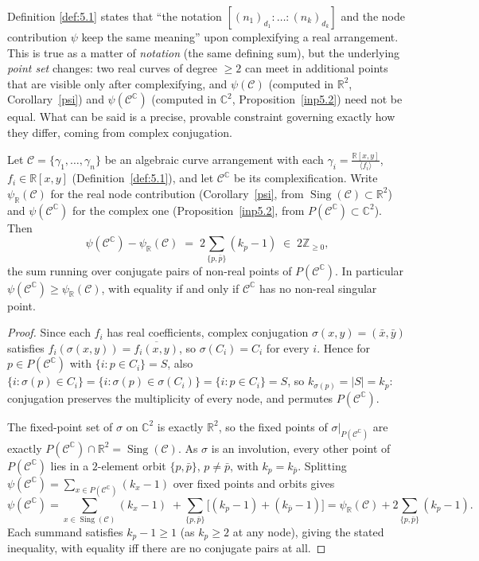 \documentclass[article,11pt]{amsart} \numberwithin{equation}{section}
\numberwithin{equation}{section}
\begin{document}
{Definition \ref{def:5.1} states that ``the notation $[(n_1)_{d_1}:\dots:(n_k)_{d_k}]$ and the
node contribution $\psi$ keep the same meaning'' upon complexifying a real arrangement. This is true as a matter of \emph{notation} (the same defining
sum), but the underlying \emph{point set} changes: two real curves of degree
$\ge2$ can meet in additional points that are visible only after
complexifying, and $\psi(\mathcal C)$ (computed in $\mathbb R^2$, Corollary~\ref{psi}) and
$\psi(\mathcal C^\mathbb C)$ (computed in $\mathbb C^2$, Proposition~\ref{inp5.2}) need not be
equal. What can be said is a precise, provable constraint governing exactly
how they differ, coming from complex conjugation.

\begin{inp}
	\label{prop:real-complex-psi}
	Let $\mathcal C=\{\gamma_1,\dots,\gamma_n\}$ be an algebraic curve
	arrangement with each $\gamma_i= \frac{\mathbb R [x,y]}{\langle f_i\rangle}$, $f_i\in\mathbb R[x,y]$ (Definition~\ref{def:5.1}),
	and let $\mathcal C^\mathbb C$ be its complexification. Write $\psi_\mathbb R(\mathcal C)$
	for the real node contribution (Corollary~\ref{psi}, from
	$\operatorname{Sing}(\mathcal C)\subset\mathbb R^2$) and $\psi(\mathcal C^\mathbb C)$ for the complex one
	(Proposition~\ref{inp5.2}, from $P(\mathcal C^\mathbb C)\subset\mathbb C^2$). Then
	\[
	\psi(\mathcal C^\mathbb C)-\psi_\mathbb R(\mathcal C)
	\;=\;2\!\!\sum_{\{p,\bar p\}}\!(k_p-1)\;\in\;2\mathbb Z_{\ge0},
	\]
	the sum running over conjugate pairs of non-real points of $P(\mathcal
	C^\mathbb C)$. In particular $\psi(\mathcal C^\mathbb C)\ge\psi_\mathbb R(\mathcal C)$, with
	equality if and only if $\mathcal C^\mathbb C$ has no non-real singular point.
\end{inp}

\begin{proof}
	Since each $f_i$ has real coefficients, complex conjugation
	$\sigma(x,y)=(\bar x,\bar y)$ satisfies $f_i(\sigma(x,y))=\overline{f_i(x,y)}$,
	so $\sigma(C_i)=C_i$ for every $i$. Hence for $p\in P(\mathcal C^\mathbb C)$ with
	$\{i:p\in C_i\}=S$, also $\{i:\sigma(p)\in C_i\}=\{i:\sigma(p)\in
	\sigma(C_i)\}=\{i:p\in C_i\}=S$, so $k_{\sigma(p)}=|S|=k_p$: conjugation
	preserves the multiplicity of every node, and permutes $P(\mathcal C^\mathbb C)$.
	
	The fixed-point set of $\sigma$ on $\mathbb C^2$ is exactly $\mathbb R^2$, so the fixed
	points of $\sigma|_{P(\mathcal C^\mathbb C)}$ are exactly $P(\mathcal
	C^\mathbb C)\cap\mathbb R^2=\operatorname{Sing}(\mathcal C)$. As $\sigma$ is an involution, every other
	point of $P(\mathcal C^\mathbb C)$ lies in a $2$-element orbit $\{p,\bar p\}$,
	$p\ne\bar p$, with $k_p=k_{\bar p}$. Splitting
	$\psi(\mathcal C^\mathbb C)=\sum_{x\in P(\mathcal C^\mathbb C)}(k_x-1)$ over fixed points
	and orbits gives
	\[
	\psi(\mathcal C^\mathbb C)=\!\!\sum_{x\in\operatorname{Sing}(\mathcal C)}\!\!(k_x-1)
	\;+\!\!\sum_{\{p,\bar p\}}\!\big[(k_p-1)+(k_{\bar p}-1)\big]
	=\psi_\mathbb R(\mathcal C)+2\!\!\sum_{\{p,\bar p\}}\!(k_p-1).
	\]
	Each summand satisfies $k_p-1\ge1$ (as $k_p\ge2$ at any node), giving the
	stated inequality, with equality iff there are no conjugate pairs at all.
\end{proof}

}
\end{document}
